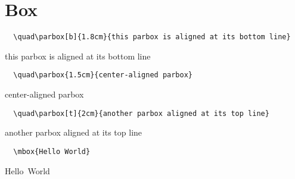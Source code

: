 

\chapter{Box}

\begin{lstlisting}
  \quad\parbox[b]{1.8cm}{this parbox is aligned at its bottom line}
\end{lstlisting}
\begin{tcolorbox}
\quad\parbox[b]{1.8cm}{this parbox is aligned at its bottom line}  
\end{tcolorbox}


\begin{lstlisting}
  \quad\parbox{1.5cm}{center-aligned parbox}
\end{lstlisting}
\begin{tcolorbox}
\quad\parbox{1.5cm}{center-aligned parbox}  
\end{tcolorbox}


\begin{lstlisting}
  \quad\parbox[t]{2cm}{another parbox aligned at its top line}
\end{lstlisting}
\begin{tcolorbox}
  \quad\parbox[t]{2cm}{another parbox aligned at its top line}
\end{tcolorbox}



\begin{lstlisting}
  \mbox{Hello World}
\end{lstlisting}

\begin{tcolorbox}
  \mbox{Hello World}
\end{tcolorbox}
